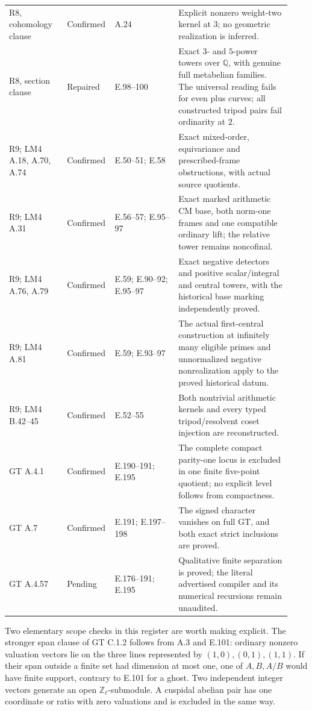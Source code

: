 \begin{longtable}{@{}p{0.20\linewidth}p{0.12\linewidth}p{0.22\linewidth}p{0.39\linewidth}@{}}
R8, cohomology clause & Confirmed & A.24 & Explicit nonzero weight-two kernel at 3; no geometric realization is inferred. \\
R8, section clause & Repaired & E.98--100 & Exact $3$- and $5$-power towers over $\mathbb Q$, with genuine full metabelian families. The universal reading fails for even plus curves; all constructed tripod pairs fail ordinarity at $2$. \\
R9; LM4 A.18, A.70, A.74 & Confirmed & E.50--51; E.58 & Exact mixed-order, equivariance and prescribed-frame obstructions, with actual source quotients. \\
R9; LM4 A.31 & Confirmed & E.56--57; E.95--97 & Exact marked arithmetic CM base, both norm-one frames and one compatible ordinary lift; the relative tower remains noncofinal. \\
R9; LM4 A.76, A.79 & Confirmed & E.59; E.90--92; E.95--97 & Exact negative detectors and positive scalar/integral and central towers, with the historical base marking independently proved. \\
R9; LM4 A.81 & Confirmed & E.59; E.93--97 & The actual first-central construction at infinitely many eligible primes and unnormalized negative nonrealization apply to the proved historical datum. \\
R9; LM4 B.42--45 & Confirmed & E.52--55 & Both nontrivial arithmetic kernels and every typed tripod/resolvent coset injection are reconstructed. \\
GT A.4.1 & Confirmed & E.190--191; E.195 & The complete compact parity-one locus is excluded in one finite five-point quotient; no explicit level follows from compactness. \\
GT A.7 & Confirmed & E.191; E.197--198 & The signed character vanishes on full GT, and both exact strict inclusions are proved. \\
GT A.4.57 & Pending & E.176--191; E.195 & Qualitative finite separation is proved; the literal advertised compiler and its numerical recursions remain unaudited. \\
\end{longtable}
\endgroup

Two elementary scope checks in this register are worth making explicit.
The stronger span clause of GT C.1.2 follows from A.3 and E.101:
ordinary nonzero valuation vectors lie on the three lines represented
by \((1,0),(0,1),(1,1)\). If their span outside a finite set had
dimension at most one, one of \(A,B,A/B\) would have finite support,
contrary to E.101 for a ghost. Two independent integer vectors generate
an open \(\mathbb Z_\ell\)-submodule. A cuspidal abelian pair has one
coordinate or ratio with zero valuations and is excluded in the same way.

